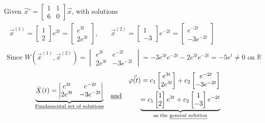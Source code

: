 \begin{example-N}
	Given $\vec{x}' = \begin{bmatrix}
			1 & 1\\ 6 & 0
		\end{bmatrix} \vec{x}$, with solutions
	\begin{gather*}
		\begin{split}
		\vec{x}^{(1)} = \begin{bmatrix}
			1 \\2
		\end{bmatrix} e^{3t} = 
		\begin{bmatrix}
			e^{3t} \\ 2e^{3t}
		\end{bmatrix},
		\end{split} \quad 
		\begin{split}
			\vec{x}^{(2)} = \begin{bmatrix}
			1 \\-3
		\end{bmatrix} e^{-2t} = 
		\begin{bmatrix}
			e^{-2t} \\ -3e^{-2t}
		\end{bmatrix}
		\end{split}\\
		\text{Since } W(\vec{x}^{(1)}, \vec{x}^{(2)} ) = 
		\begin{vmatrix}
			e^{3t} & e^{-2t}\\
			2e^{3t} & -3e^{-2t}
		\end{vmatrix} = -3e^{3t}e^{-2t} - 2e^{3t}e^{-2t} = -5e^{t} \neq 0 \text{ on } \mathbb{R}
	\end{gather*}
	\begin{gather*}
		\begin{split}
		\underbrace{\Xlines(t) = 
		\begin{vmatrix}
			e^{3t} & e^{-2t}\\
			2e^{3t} & -3e^{-2t}\\
		\end{vmatrix}}_
		{\text{\underline{Fundamental set of solutions}}}
		\end{split} \quad \text{\underline{and}} \quad 
		\begin{split}
			\vec{\varphi(t)} = c_1
			\begin{bmatrix}
				e^{3t}\\ 2e^{3t}
			\end{bmatrix} + c_2
			\begin{bmatrix}
				e^{-2t}\\ -3e^{-2t}
			\end{bmatrix}\\
			\underbrace{= c_1
			\begin{bmatrix}
				1\\2
			\end{bmatrix} e^{3t} + c_2
			\begin{bmatrix}
				1\\-3
			\end{bmatrix} e^{-2t}}_{\text{as the \underline{general solution}}}
		\end{split} 
	\end{gather*}
\end{example-N}
